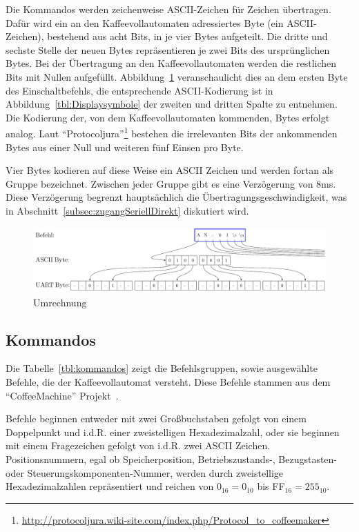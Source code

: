 Die Kommandos werden zeichenweise ASCII-Zeichen für Zeichen übertragen.
Dafür wird ein an den Kaffeevollautomaten adressiertes Byte (ein ASCII-Zeichen), bestehend aus acht Bits, in je vier Bytes aufgeteilt.
Die dritte und sechste Stelle der neuen Bytes repräsentieren je zwei Bits des ursprünglichen Bytes.
Bei der Übertragung an den Kaffeevollautomaten werden die restlichen Bits mit Nullen aufgefüllt.
Abbildung~\ref{fig:uart} veranschaulicht dies an dem ersten Byte des Einschaltbefehls, die entsprechende ASCII-Kodierung ist in Abbildung~\ref{tbl:Displaysymbole} der zweiten und dritten Spalte zu entnehmen.
Die Kodierung der, von dem Kaffeevollautomaten kommenden, Bytes erfolgt analog.
Laut "`Protocoljura"'\footnote{\url{http://protocoljura.wiki-site.com/index.php/Protocol_to_coffeemaker}} bestehen die irrelevanten Bits der ankommenden Bytes aus einer Null und weiteren fünf Einsen pro Byte.

Vier Bytes kodieren auf diese Weise ein ASCII Zeichen und werden fortan als Gruppe bezeichnet.
Zwischen jeder Gruppe gibt es eine Verzögerung von 8ms.
Diese Verzögerung begrenzt hauptsächlich die Übertragungsgeschwindigkeit, was in Abschnitt~\ref{subsec:zugangSeriellDirekt} diskutiert wird.

\begin{figure}
  \begin{center}
    \includegraphics[scale=0.6]{images/chapter_3/UART-Bytes}
    \caption{Umrechnung }
    \label{fig:uart}
  \end{center}
\end{figure}

\subsection{Kommandos}\label{subsec:Kommandos}
Die Tabelle~\ref{tbl:kommandos} zeigt die Befehlsgruppen, sowie ausgewählte Befehle, die der Kaffeevollautomat versteht.
Diese Befehle stammen aus dem "`CoffeeMachine"' Projekt~\cite{GitCoffeeMachine}.

Befehle beginnen entweder mit zwei Großbuchstaben gefolgt von einem Doppelpunkt und i.d.R. einer zweistelligen Hexadezimalzahl, oder sie beginnen mit einem Fragezeichen gefolgt von i.d.R. zwei ASCII Zeichen.
Positionsnummern, egal ob Speicherposition, \mbox{Betriebszustands-,} Bezugstasten- oder Steuerungskomponenten-Nummer, werden durch zweistellige Hexadezimalzahlen repräsentiert und reichen von $0_{16}=0_{10}$ bis FF$_{16}=255_{10}$.

